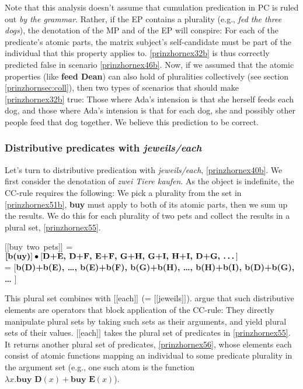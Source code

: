 \documentclass[output=paper,colorlinks,citecolor=brown,
]{langscibook}
\newcommand{\sem}[2]{\mbox{$[\![${#2}$]\!]^{#1}$}} %
\begin{document}
Note that this analysis doesn't assume that cumulation predication in PC is ruled out \textit{by the grammar}. Rather, if the EP contains a plurality (e.g., \textit{fed the three dogs}), the denotation of the MP and of the EP will conspire: For each of the predicate's atomic parts,  the matrix subject's self-candidate must be part of the individual that this property applies to. \ref{prinzhornex32b} is thus correctly predicted false in scenario \ref{prinzhornex46b}. Now, if we assumed that the atomic properties (like \textbf{feed Dean}) can also hold of pluralities collectively (see section \ref{prinzhornsec:coll}), then  two types of scenarios that should make \ref{prinzhornex32b} true: Those where Ada's intension is that she herself feeds each dog, and those where Ada's intension is that for each dog, she and possibly other people feed that dog together. We believe this prediction to be correct.








\subsubsection{Distributive predicates with \textit{jeweils/each}}\label{prinzhornsec:dist}  Let's turn to distributive predication with \textit{jeweils/each}, \ref{prinzhornex40b}. We first consider the denotation of \textit{zwei Tiere kaufen}. As the object is indefinite, the CC-rule requires the following: We pick a plurality from the set in \ref{prinzhornex51b},  \textbf{buy} must apply to both of its atomic parts, then we sum up the results. We do this for each plurality of two pets and collect the results in a plural set, \ref{prinzhornex55}.

\ea \sem{}{buy two pets} = $\textbf[\textbf{b(uy)}] \bullet [ \textbf{D+E, D+F, E+F, G+H, G+I, H+I, D+G,  \dots} ]$\\ = 
$[$\textbf{b(D)+b(E), \dots, b(E)+b(F), b(G)+b(H), \dots, b(H)+b(I), b(D)+b(G), \dots} $]$\label{prinzhornex55} \z

This plural set combines with \sem{}{each} (= \sem{}{jeweils}). \cite{Haslinger:2018b} argue that such distributive elements are operators that block application of the CC-rule: They directly manipulate plural sets by  taking such sets as their arguments, and  yield plural sets of their values. \sem{}{each} takes the plural set of predicates in \ref{prinzhornex55}. It returns another plural set of predicates, \ref{prinzhornex56}, whose elements each consist of atomic functions  mapping an individual to some predicate plurality in the argument set (e.g., one such atom is the function $\lambda x.\textbf{buy D}(x)+\textbf{buy E}(x)$).
\end{document}
